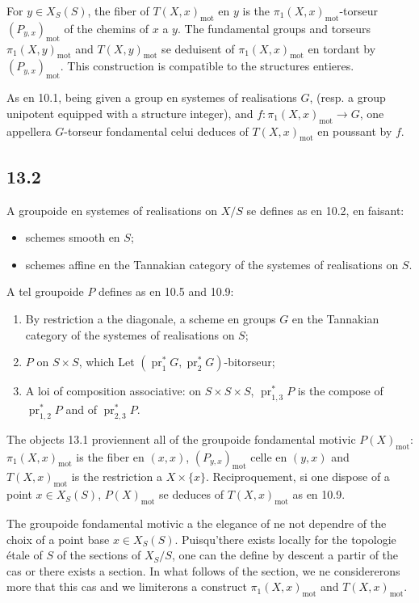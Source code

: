\documentclass[12pt,a4paper]{article}
\theoremstyle{plain}
\theoremstyle{definition}
\theoremstyle{remark}
\DeclareMathOperator{\pr}{pr}
\newcommand{\mot}{\mathrm{mot}}
\begin{document}
For $y \in X_S(S)$, the fiber of $T(X,x)_{\mot}$ en $y$ is the $\pi_1(X,x)_{\mot}$-torseur $(P_{y,x})_{\mot}$ of the chemins of $x$ a $y$. The fundamental groups and torseurs $\pi_1(X,y)_{\mot}$ and $T(X,y)_{\mot}$ se deduisent of $\pi_1(X,x)_{\mot}$ en tordant by $(P_{y,x})_{\mot}$. This construction is compatible to the structures entieres.

As en 10.1, being given a group en systemes of realisations $G$, (resp. a group unipotent equipped with a structure integer), and $f : \pi_1(X,x)_{\mot} \to G$, one appellera $G$-torseur fondamental celui deduces of $T(X,x)_{\mot}$ en poussant by $f$.

\subsection*{13.2}

A groupoide en systemes of realisations on $X/S$ se defines as en 10.2, en faisant:
\begin{itemize}[nosep]
\item[$S$:] schemes smooth en $S$;
\item[$\mathcal{F}(T)$:] schemes affine en the Tannakian category of the systemes of realisations on $S$.
\end{itemize}
A tel groupoide $P$ defines as en 10.5 and 10.9:
\begin{enumerate}[label=(\alph*), nosep]
\item By restriction a the diagonale, a scheme en groups $G$ en the Tannakian category of the systemes of realisations on $S$;
\item $P$ on $S \times S$, which Let $(\pr_1^* G, \pr_2^* G)$-bitorseur;
\item A loi of composition associative: on $S \times S \times S$, $\pr_{1,3}^* P$ is the compose of $\pr_{1,2}^* P$ and of $\pr_{2,3}^* P$.
\end{enumerate}

The objects 13.1 proviennent all of the groupoide fondamental motivic $P(X)_{\mot}$: $\pi_1(X,x)_{\mot}$ is the fiber en $(x,x)$, $(P_{y,x})_{\mot}$ celle en $(y,x)$ and $T(X,x)_{\mot}$ is the restriction a $X \times \{x\}$. Reciproquement, si one dispose of a point $x \in X_S(S)$, $P(X)_{\mot}$ se deduces of $T(X,x)_{\mot}$ as en 10.9.

The groupoide fondamental motivic a the elegance of ne not dependre of the choix of a point base $x \in X_S(S)$. Puisqu'there exists locally for the topologie étale of $S$ of the sections of $X_S/S$, one can the define by descent a partir of the cas or there exists a section. In what follows of the section, we ne considererons more that this cas and we limiterons a construct $\pi_1(X,x)_{\mot}$ and $T(X,x)_{\mot}$.
\end{document}
